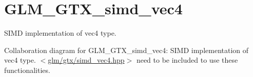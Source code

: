 \hypertarget{group__gtx__simd__vec4}{\section{G\-L\-M\-\_\-\-G\-T\-X\-\_\-simd\-\_\-vec4}
\label{group__gtx__simd__vec4}
}


S\-I\-M\-D implementation of vec4 type.  


Collaboration diagram for G\-L\-M\-\_\-\-G\-T\-X\-\_\-simd\-\_\-vec4\-:
S\-I\-M\-D implementation of vec4 type. $<$\hyperlink{simd__vec4_8hpp}{glm/gtx/simd\-\_\-vec4.\-hpp}$>$ need to be included to use these functionalities. 